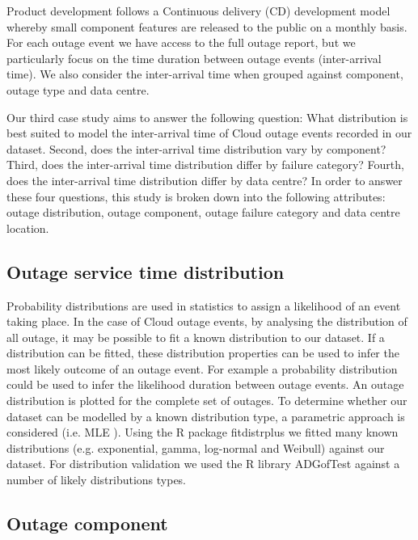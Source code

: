 Product development follows a Continuous delivery (CD) development model whereby small component features are released to the public on a monthly basis. For each outage event we have access to the full outage report, but we particularly focus on the time duration between outage events (inter-arrival time). We also consider the inter-arrival time when grouped against component, outage type and data centre. 

Our third case study aims to answer the following question: What distribution is best suited to model the inter-arrival time of Cloud outage events recorded in our dataset. Second, does the inter-arrival time distribution vary by component? Third, does the inter-arrival time distribution differ by failure category? Fourth, does the inter-arrival time distribution differ by data centre? In order to answer these four questions, this study is broken down into the following attributes: outage distribution, outage component, outage failure category and  data centre location.

\subsection{Outage service time distribution}

Probability distributions are used in statistics to assign a likelihood of an event taking place. In the case of Cloud outage events, by analysing the distribution of all outage, it may be possible to fit a known distribution to our dataset. If a distribution can be fitted, these distribution properties can be used to infer the most likely outcome of an outage event. For example a probability distribution could be used to infer the likelihood duration between outage events. An outage distribution is plotted for the complete set of outages. To determine whether our dataset can be modelled by a known distribution type, a parametric approach is considered (i.e. MLE \cite{pearson1894contributions}). Using the R package 
fitdistrplus \cite{fitdistrplus} we fitted many known distributions (e.g. exponential, gamma, log-normal and Weibull)
 against our dataset. For distribution validation we used the R library ADGofTest \cite{ADGoF} against a number of likely distributions types. 

\subsection{Outage component}

